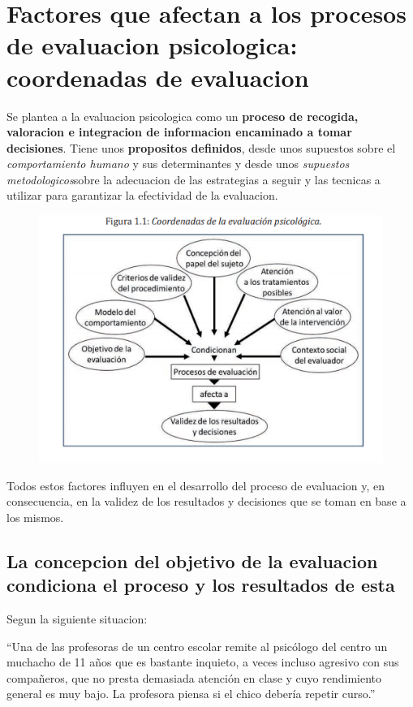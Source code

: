 \documentclass[12pt,a4paper]{article}
\begin{document}
\section{Factores que afectan a los procesos de evaluacion psicologica: coordenadas de evaluacion}

Se plantea a la evaluacion psicologica como un \textbf{proceso de recogida, valoracion e integracion de informacion encaminado a tomar decisiones}. Tiene unos \textbf{propositos definidos}, desde unos supuestos sobre el \textit{comportamiento humano} y sus determinantes y desde unos \textit{supuestos metodologicos}sobre la adecuacion de las estrategias a seguir y las tecnicas a utilizar para garantizar la efectividad de la evaluacion. 

\begin{figure}[htpb]
	\centering
		\includegraphics[width=0.8\linewidth]{coordenadas.png}
	\label{fig:coordenadas}
\end{figure}

Todos estos factores influyen en el desarrollo del proceso de evaluacion y, en consecuencia, en la validez de los resultados y decisiones que se toman en base a los mismos. 

\subsection{La concepcion del objetivo de la evaluacion condiciona el proceso y los resultados de esta}%
\label{sub:la_concepcion_del_objetivo_de_la_evaluacion_condiciona_el_proceso_y_los_resultados_de_esta}

Segun la siguiente situacion:
\begin{shaded}
\enquote{{Una de las profesoras de un centro escolar remite al psicólogo del centro un muchacho de 11 años que es bastante inquieto, a veces incluso agresivo con sus compañeros, que no presta demasiada atención en clase y cuyo rendimiento general es muy bajo. La profesora piensa si el chico debería repetir curso.}}
\end{shaded}
\end{document}
